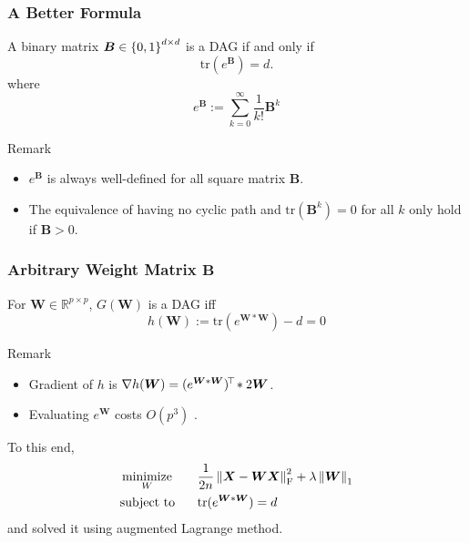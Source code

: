 \documentclass[10pt,xcolor={usenames,dvipsnames,table}]{beamer}
\begin{document}
\begin{frame}
    \frametitle{A Better Formula}

    \begin{proposition}
        A binary matrix $\bm{B} \in \left\{0, 1\right\}^{d \times d}$ is a DAG if and only if 
        \[
        \text{tr} (e^{\bm{B}}) = d.
        \] 
        where 
\[
e^{\bm{B}} := \sum^{\infty}_{k=0} \dfrac{1}{k!} \bm{B}^{k}
\] 

    \end{proposition}
    \begin{block}{Remark}
        \begin{itemize}
            \item $e^{\bm{B}}$ is always well-defined for all square matrix $\bm{B}$.
            \item The equivalence of having no cyclic path and $\text{tr}(\bm{B}^{k}) = 0$ for all $k$ only hold if $\bm{B}>0$.
        \end{itemize}
    \end{block}
\end{frame}

\begin{frame}
    \frametitle{Arbitrary Weight Matrix $\bm{B}$}
    \begin{theorem}
        For $\bm{W} \in \mathbb{R}^{p\times  p}$, $G(\bm{W})$ is a DAG iff 
        \[
        h(\bm{W}) := \text{tr} \left( e^{\bm{W}*\bm{W}} \right) - d = 0
        \] 
    \end{theorem}
    \begin{block}{Remark}
        \begin{itemize}
            \item Gradient of $h$ is $\nabla h(\bm{W}) = (e^{\bm{W} * \bm{W}})^{\!\top\!} * 2\bm{W}$.
            \item Evaluating $e^{\bm{W}}$ costs $O(p^{3})$ \citep{al2010new}.
        \end{itemize}
    \end{block}
    To this end,
    \begin{alignat*}{2}
        & \operatorname*{minimize}_{W} \quad && \dfrac{1}{2n}\left\lVert\bm{X} - \bm{W}\bm{X}\right\rVert_{\rm F}^2 + \lambda \left\lVert\bm{W}\right\rVert_1\\
        & \text{subject to} && \text{tr}(e^{\bm{W} * \bm{W}}) = d
    \end{alignat*}
    and \citep{zheng2018dags} solved it using augmented Lagrange method.
\end{frame}
\end{document}
